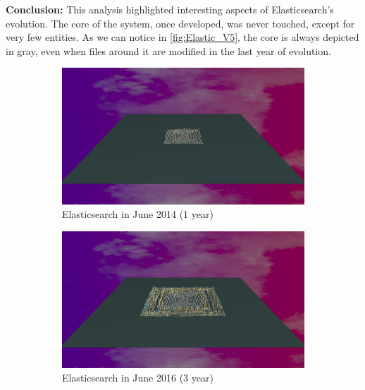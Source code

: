 \bigbreak
\textbf{Conclusion:} This analysis highlighted interesting aspects of Elasticsearch's evolution. The core of the system, once developed, was never touched, except for very few entities. As we can notice in  \autoref{fig:Elastic_V5}, the core is always depicted in gray, even when files around it are modified in the last year of evolution. 

\begin{figure}[ht]
    \begin{subfigure}{0.48\textwidth}
        \includegraphics[width=\linewidth]{Elasticsearch/Animation001.png}
        \caption{Elasticsearch in June 2014 (1 year)} 
        \label{fig:Elastic_V5_S1}
    \end{subfigure}\hspace*{\fill}
    \begin{subfigure}{0.48\textwidth}
        \includegraphics[width=\linewidth]{Elasticsearch/Animation003.png}
        \caption{Elasticsearch in June 2016 (3 year)} 
        \label{fig:Elastic_V5_S2}
    \end{subfigure}
    \medskip
    \begin{subfigure}{0.48\textwidth}

\end{subfigure}
\end{figure}
